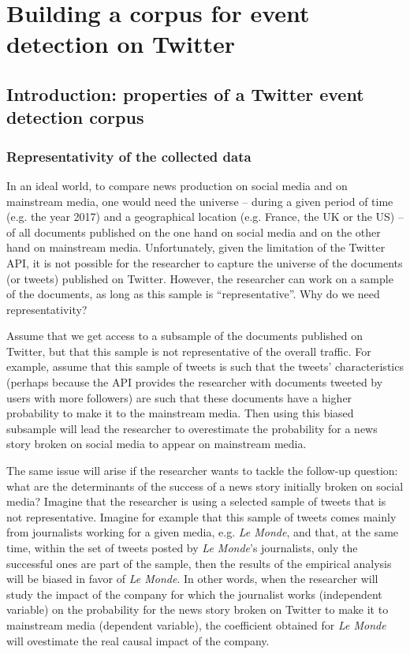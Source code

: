 \chapter{Building a corpus for event detection on Twitter}

\section{Introduction: properties of a Twitter event detection corpus}

\subsection{Representativity of the collected data}
In an ideal world, to compare news production on social media and on mainstream media, one would need the universe – during a given period of time (e.g. the year 2017) and a geographical location (e.g. France, the UK or the US) – of all documents published on the one hand on social media and on the other hand on mainstream media. Unfortunately, given the limitation of the Twitter API, it is not possible for the researcher to capture the universe of the documents (or tweets) published on Twitter. However, the researcher can work on a sample of the documents, as long as this sample is ``representative”. Why do we need representativity?


Assume that we get access to a subsample of the documents published on Twitter, but that this sample is not representative of the overall traffic. For example, assume that this sample of tweets is such that the tweets’ characteristics (perhaps because the API provides the researcher with documents tweeted by users with more followers) are such that these documents have a higher probability to make it to the mainstream media. Then using this biased subsample will lead the researcher to overestimate the probability for a news story broken on social media to appear on mainstream media.


The same issue will arise if the researcher wants to tackle the follow-up question: what are the determinants of the success of a news story initially broken on social media? Imagine that the researcher is using a selected sample of tweets that is not representative. Imagine for example that this sample of tweets comes mainly from journalists working for a given media, e.g. \textit{Le Monde}, and that, at the same time, within the set of tweets posted by \textit{Le Monde}’s journalists, only the successful ones are part of the sample, then the results of the empirical analysis will be biased in favor of \textit{Le Monde}. In other words, when the researcher will study the impact of the company for which the journalist works (independent variable) on the probability for the news story broken on Twitter to make it to mainstream media (dependent variable), the coefficient obtained for \textit{Le Monde} will ovestimate the real causal impact of the company.


